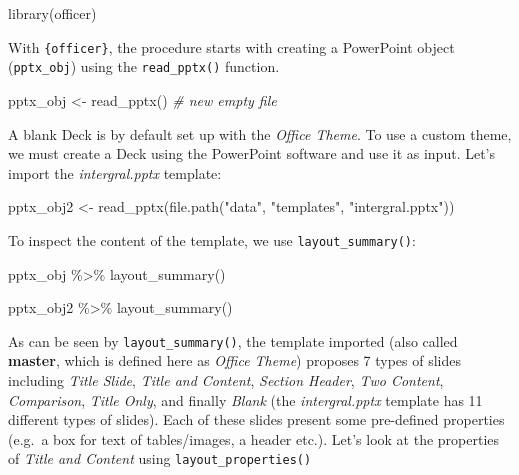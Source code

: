 \documentclass[
]{book}
\newenvironment{Shaded}{\begin{snugshade}}{\end{snugshade}}
\newcommand{\CommentTok}[1]{\textcolor[rgb]{0.56,0.35,0.01}{\textit{#1}}}
\newcommand{\FunctionTok}[1]{\textcolor[rgb]{0.00,0.00,0.00}{#1}}
\newcommand{\NormalTok}[1]{#1}
\newcommand{\OtherTok}[1]{\textcolor[rgb]{0.56,0.35,0.01}{#1}}
\newcommand{\SpecialCharTok}[1]{\textcolor[rgb]{0.00,0.00,0.00}{#1}}
\newcommand{\StringTok}[1]{\textcolor[rgb]{0.31,0.60,0.02}{#1}}
\begin{document}
\begin{Shaded}
\begin{Highlighting}[]
\FunctionTok{library}\NormalTok{(officer)}
\end{Highlighting}
\end{Shaded}

With \texttt{\{officer\}}, the procedure starts with creating a PowerPoint object (\texttt{pptx\_obj}) using the \texttt{read\_pptx()} function.

\begin{Shaded}
\begin{Highlighting}[]
\NormalTok{pptx\_obj }\OtherTok{\textless{}{-}} \FunctionTok{read\_pptx}\NormalTok{() }\CommentTok{\# new empty file}
\end{Highlighting}
\end{Shaded}

A blank Deck is by default set up with the \emph{Office Theme}. To use a custom theme, we must create a Deck using the PowerPoint software and use it as input. Let's import the \emph{intergral.pptx} template:

\begin{Shaded}
\begin{Highlighting}[]
\NormalTok{pptx\_obj2 }\OtherTok{\textless{}{-}} \FunctionTok{read\_pptx}\NormalTok{(}\FunctionTok{file.path}\NormalTok{(}\StringTok{"data"}\NormalTok{, }\StringTok{"templates"}\NormalTok{, }\StringTok{"intergral.pptx"}\NormalTok{))}
\end{Highlighting}
\end{Shaded}

To inspect the content of the template, we use \texttt{layout\_summary()}:

\begin{Shaded}
\begin{Highlighting}[]
\NormalTok{pptx\_obj }\SpecialCharTok{\%\textgreater{}\%}
  \FunctionTok{layout\_summary}\NormalTok{()}

\NormalTok{pptx\_obj2 }\SpecialCharTok{\%\textgreater{}\%} 
  \FunctionTok{layout\_summary}\NormalTok{()}
\end{Highlighting}
\end{Shaded}

As can be seen by \texttt{layout\_summary()}, the template imported (also called \textbf{master}, which is defined here as \emph{Office Theme}) proposes 7 types of slides including \emph{Title Slide}, \emph{Title and Content}, \emph{Section Header}, \emph{Two Content}, \emph{Comparison}, \emph{Title Only}, and finally \emph{Blank} (the \emph{intergral.pptx} template has 11 different types of slides). Each of these slides present some pre-defined properties (e.g.~a box for text of tables/images, a header etc.). Let's look at the properties of \emph{Title and Content} using \texttt{layout\_properties()}
\end{document}
